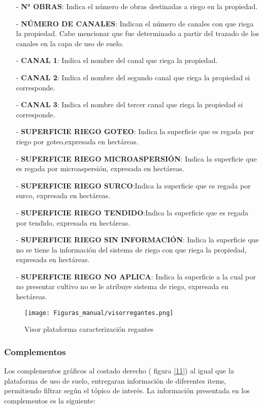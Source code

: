 \documentclass[10pt]{article}
\begin{document}
\begin{itemize}
\item[-]\textbf{N° OBRAS}: Indica el número de obras destinadas a riego en la propiedad.
\item[-]\textbf{NÚMERO DE CANALES}: Indican el número de canales con que riega la propiedad. Cabe mencionar que fue determinado a partir del trazado de los canales en la capa de uso de suelo.
\item[-]\textbf{CANAL 1}: Indica el nombre del canal que riega la propiedad.
\item[-]\textbf{CANAL 2}: Indica el nombre del segundo canal que riega la propiedad si corresponde.
\item[-]\textbf{CANAL 3}: Indica el nombre del tercer canal que riega la propiedad si corresponde.
\item[-]\textbf{SUPERFICIE RIEGO GOTEO}: Indica la superficie que es regada por riego por goteo,expresada en hectáreas.
\item[-]\textbf{SUPERFICIE RIEGO MICROASPERSIÓN}: Indica la superficie que es regada por microaspersión, expresada en hectáreas.
\item[-]\textbf{SUPERFICIE RIEGO SURCO}:Indica la superficie que es regada por surco, expresada en hectáreas.
\item[-]\textbf{SUPERFICIE RIEGO TENDIDO}:Indica la superficie que es regada por tendido, expresada en hectáreas.
\item[-]\textbf{SUPERFICIE RIEGO SIN INFORMACIÓN}: Indica la superficie que no se tiene la información del sistema de riego con que riega la propiedad, expresada en hectáreas.
\item[-]\textbf{SUPERFICIE RIEGO NO APLICA}: Indica la superficie a la cual por no presentar cultivo no se le atribuye sistema de riego, expresada en hectáreas.
\end{itemize}

\begin{figure}[H]
\centering
\texttt{[image: Figuras\_manual/visorregantes.png]}
\caption{Visor plataforma caracterización regantes}
\label{10}
\end{figure}

\subsubsection{Complementos}
\label{complementos}

Los complementos gráficos al costado derecho ( figura \ref{11}) al  igual que la plataforma de uso de suelo, entregaran información de diferentes items, permitiendo filtrar según el tópico de interés. La información presentada en los complementos es la siguiente:
\end{document}
